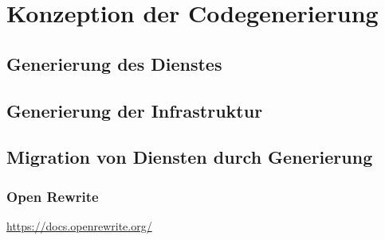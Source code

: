 \chapter{Konzeption der Codegenerierung}

\section{Generierung des Dienstes}

\section{Generierung der Infrastruktur}

\section{Migration von Diensten durch Generierung}

\subsection{Open Rewrite}
\url{https://docs.openrewrite.org/}